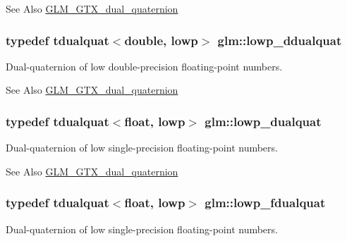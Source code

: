 \begin{DoxySeeAlso}{See Also}
\hyperlink{group__gtx__dual__quaternion}{G\-L\-M\-\_\-\-G\-T\-X\-\_\-dual\-\_\-quaternion} 
\end{DoxySeeAlso}
\hypertarget{group__gtx__dual__quaternion_ga361a2ea6cce1446a8ab7e7803156c16c}{
\subsubsection[{lowp\-\_\-ddualquat}]{\setlength{\rightskip}{0pt plus 5cm}typedef tdualquat$<$double, lowp$>$ {\bf glm\-::lowp\-\_\-ddualquat}}}\label{group__gtx__dual__quaternion_ga361a2ea6cce1446a8ab7e7803156c16c}
Dual-\/quaternion of low double-\/precision floating-\/point numbers.

\begin{DoxySeeAlso}{See Also}
\hyperlink{group__gtx__dual__quaternion}{G\-L\-M\-\_\-\-G\-T\-X\-\_\-dual\-\_\-quaternion} 
\end{DoxySeeAlso}
\hypertarget{group__gtx__dual__quaternion_ga4888200ed911e4887c2423fed74ad362}{
\subsubsection[{lowp\-\_\-dualquat}]{\setlength{\rightskip}{0pt plus 5cm}typedef tdualquat$<$float, lowp$>$ {\bf glm\-::lowp\-\_\-dualquat}}}\label{group__gtx__dual__quaternion_ga4888200ed911e4887c2423fed74ad362}
Dual-\/quaternion of low single-\/precision floating-\/point numbers.

\begin{DoxySeeAlso}{See Also}
\hyperlink{group__gtx__dual__quaternion}{G\-L\-M\-\_\-\-G\-T\-X\-\_\-dual\-\_\-quaternion} 
\end{DoxySeeAlso}
\hypertarget{group__gtx__dual__quaternion_ga797f6d2679ab6773c1f057b97bf95111}{
\subsubsection[{lowp\-\_\-fdualquat}]{\setlength{\rightskip}{0pt plus 5cm}typedef tdualquat$<$float, lowp$>$ {\bf glm\-::lowp\-\_\-fdualquat}}}\label{group__gtx__dual__quaternion_ga797f6d2679ab6773c1f057b97bf95111}
Dual-\/quaternion of low single-\/precision floating-\/point numbers.

